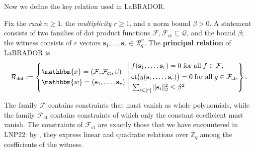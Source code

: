 \documentclass[../../book.tex]{subfiles}
\begin{document}
Now we define the key relation used in LaBRADOR.

\begin{definition}\label{def:labrador-relation}
    Fix the \emph{rank} $n \geq 1$, the \emph{multiplicity} $r \geq 1$, and a norm bound $\beta > 0$.
    A statement consists of two families of dot product functions $\mathcal{F}, \mathcal{F}_{\mathsf{ct}} \subseteq \mathcal{Q}$, and the bound $\beta$; the witness consists of $r$ vectors $\mathbf{s}_1, \dots, \mathbf{s}_r \in \mathcal{R}_q^n$.
    The \textbf{principal relation} of LaBRADOR is
    \begin{equation*}
        \mathcal{R}_{\mathsf{dot}} := \left\{
            \begin{aligned}
                & \mathbbm{x} = (\mathcal{F}, \mathcal{F}_{\mathsf{ct}}, \beta) \\
                & \mathbbm{w} = (\mathbf{s}_1, \dots, \mathbf{s}_r)
            \end{aligned}
        \;\middle|\;
        \begin{aligned}
            & f(\mathbf{s}_1, \dots, \mathbf{s}_r) = 0 \; \text{for all} \; f \in \mathcal{F}, \\
            & \mathsf{ct}\big(g(\mathbf{s}_1, \dots, \mathbf{s}_r)\big) = 0 \; \text{for all} \; g \in \mathcal{F}_{\mathsf{ct}}, \\
            & \textstyle\sum_{i \in [r]} \|\mathbf{s}_i\|_2^2 \leq \beta^2
        \end{aligned}
        \right\}.
    \end{equation*}
\end{definition}

The family $\mathcal{F}$ contains constraints that must vanish as whole polynomials, while the family $\mathcal{F}_{\mathsf{ct}}$ contains constraints of which only the constant coefficient must vanish.
The constraints of $\mathcal{F}_{\mathsf{ct}}$ are exactly those that we have encountered in LNP22: by , they express linear and quadratic relations over $\mathbb{Z}_q$ among the coefficients of the witness.
\end{document}
